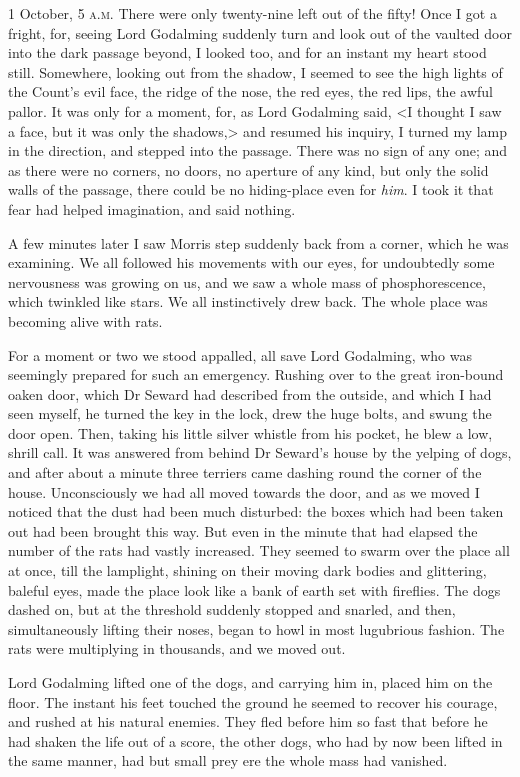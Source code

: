 \begin{diary}{1 October, 5 \textsc{a.m.}}
There were only twenty-nine left out of the fifty! Once I got a fright, for, seeing Lord Godalming suddenly turn and look out of the vaulted door into the dark passage beyond, I looked too, and for an instant my heart stood still. Somewhere, looking out from the shadow, I seemed to see the high lights of the Count's evil face, the ridge of the nose, the red eyes, the red lips, the awful pallor. It was only for a moment, for, as Lord Godalming said, <I thought I saw a face, but it was only the shadows,> and resumed his inquiry, I turned my lamp in the direction, and stepped into the passage. There was no sign of any one; and as there were no corners, no doors, no aperture of any kind, but only the solid walls of the passage, there could be no hiding-place even for \textit{him}. I took it that fear had helped imagination, and said nothing.

A few minutes later I saw Morris step suddenly back from a corner, which he was examining. We all followed his movements with our eyes, for undoubtedly some nervousness was growing on us, and we saw a whole mass of phosphorescence, which twinkled like stars. We all instinctively drew back. The whole place was becoming alive with rats.

For a moment or two we stood appalled, all save Lord Godalming, who was seemingly prepared for such an emergency. Rushing over to the great iron-bound oaken door, which Dr Seward had described from the outside, and which I had seen myself, he turned the key in the lock, drew the huge bolts, and swung the door open. Then, taking his little silver whistle from his pocket, he blew a low, shrill call. It was answered from behind Dr Seward's house by the yelping of dogs, and after about a minute three terriers came dashing round the corner of the house. Unconsciously we had all moved towards the door, and as we moved I noticed that the dust had been much disturbed: the boxes which had been taken out had been brought this way. But even in the minute that had elapsed the number of the rats had vastly increased. They seemed to swarm over the place all at once, till the lamplight, shining on their moving dark bodies and glittering, baleful eyes, made the place look like a bank of earth set with fireflies. The dogs dashed on, but at the threshold suddenly stopped and snarled, and then, simultaneously lifting their noses, began to howl in most lugubrious fashion. The rats were multiplying in thousands, and we moved out.

Lord Godalming lifted one of the dogs, and carrying him in, placed him on the floor. The instant his feet touched the ground he seemed to recover his courage, and rushed at his natural enemies. They fled before him so fast that before he had shaken the life out of a score, the other dogs, who had by now been lifted in the same manner, had but small prey ere the whole mass had vanished.


\end{diary}
